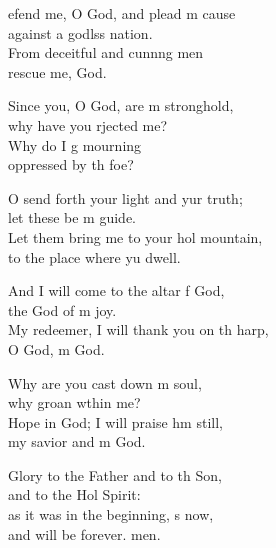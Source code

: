 \begin{psalmverse}
  \begin{patverse}
    efend me, O God, and plead m cause\Med\\
against a godlss nation.\\
From deceitful and cunn\pointup{\i}ng men\Med\\
rescue me,  God.

Since you, O God, are m stronghold,\Med\\
why have you rjected me?\\
Why do I g mourning\Med\\
oppressed by th foe?

O send forth your light and yur truth;\Med\\
let these be m guide.\\
Let them bring me to your hol mountain,\Med\\
to the place where yu dwell.

And I will come to the altar f God,\Med\\
the God of m joy.\\
My redeemer, I will thank you on th harp,\Med\\
O God, m God.

Why are you cast down m soul,\Med\\
why groan w\pointup{\i}thin me?\\
Hope in God; I will praise h\pointup{\i}m still,\Med\\
my savior and m God.

Glory to the Father and to th Son,\Med\\
and to the Hol Spirit:\\
as it was in the beginning, \pointup{\i}s now,\Med\\
and will be forever. men.
  \end{patverse}
\end{psalmverse}
